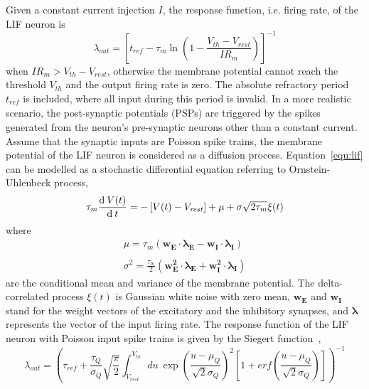 Given a constant current injection $I$, the response function, i.e. firing rate, of the LIF neuron is
\begin{equation}
\lambda_\mathit{out}=
\left [ t_\mathit{ref}-\tau_m\ln \left ( 1-\frac{V_{th}-V_\mathit{rest}}{IR_m}  \right )\right ]^{-1}
\label{equ:consI}
\end{equation}
when $IR_m>V_{th}-V_{rest}$, otherwise the membrane potential cannot reach the threshold $V_{th}$ and the output firing rate is zero. 
The absolute refractory period $t_\mathit{ref}$ is included, where all input during this period is invalid.
In a more realistic scenario, the post-synaptic potentials (PSPs) are triggered by the spikes generated from the neuron's pre-synaptic neurons other than a constant current.
Assume that the synaptic inputs are Poisson spike trains, the membrane potential of the LIF neuron is considered as a diffusion process. Equation~\ref{equ:lif} can be modelled as a stochastic differential equation referring to Ornstein-Uhlenbeck process,
\begin{equation}
\tau_m\frac{\mathrm{d}\:V(t)}{\mathrm{d}\:  t}=-\left[V(t)-V_\mathit{rest}\right] + \mu + \sigma\sqrt{2\tau_m}\xi (t)
\label{equ:sde}
\end{equation}
where
\begin{equation}
\begin{array}{l}
\mu=\tau_m(\mathbf{w_E\cdot\lambda_E}-\mathbf{w_I\cdot\lambda_I})
\\
\\
\sigma ^{2} = \frac{\tau_m}{2}\left(\mathbf{w_E^{2}\cdot\lambda_E}+\mathbf{w_I^{2}\cdot\lambda_I}\right)
\end{array}
\label{equ:ou}
\end{equation}
are the conditional mean and variance of the membrane potential.
The delta-correlated process $\xi(t)$ is Gaussian white noise with zero mean, $\mathbf{w_E}$ and $\mathbf{w_I}$ stand for the weight vectors of the excitatory and the inhibitory synapses, and $\mathbf{\lambda}$ represents the vector of the input firing rate.
The response function of the LIF neuron with Poisson input spike trains is given by the Siegert function~\cite{siegert1951first}, 
\begin{equation}
\lambda_\mathit{out}=\left(\tau_\mathit{ref} + \frac{\tau_Q}{\sigma_Q}\sqrt{\frac{\pi}{2}} \int_{V_\mathit{rest}}^{V_\mathit{th}}du \:\exp \left(\frac{u-\mu_Q}{\sqrt2\sigma_Q} \right )^{2}\left[1+erf \left(\frac{u-\mu_Q}{\sqrt2\sigma_Q} \right ) \right ]\right)^{-1}
\end{equation}
